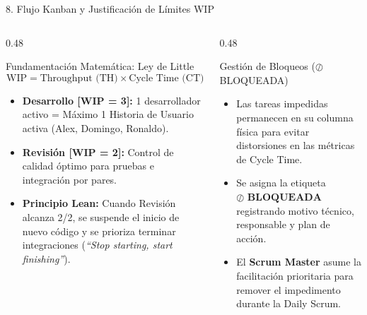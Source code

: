 \documentclass[aspectratio=169, 10pt, spanish]{beamer}
\begin{document}
\begin{frame}{8. Flujo Kanban y Justificación de Límites WIP}
\begin{columns}[T]
    \begin{column}{0.48\textwidth}
        \begin{academicbox}{Fundamentación Matemática: Ley de Little}
            \scriptsize
            $$\text{WIP} = \text{Throughput (TH)} \times \text{Cycle Time (CT)}$$
            \begin{itemize}
                \item \textbf{Desarrollo [WIP = 3]:} 1 desarrollador activo = Máximo 1 Historia de Usuario activa (Alex, Domingo, Ronaldo).
                \item \textbf{Revisión [WIP = 2]:} Control de calidad óptimo para pruebas e integración por pares.
                \item \textbf{Principio Lean:} Cuando Revisión alcanza 2/2, se suspende el inicio de nuevo código y se prioriza terminar integraciones (\textit{``Stop starting, start finishing''}).
            \end{itemize}
        \end{academicbox}
    \end{column}
    \begin{column}{0.48\textwidth}
        \begin{formalbox}{Gestión de Bloqueos ($\oslash$ BLOQUEADA)}
            \scriptsize
            \begin{itemize}
                \item Las tareas impedidas permanecen en su columna física para evitar distorsiones en las métricas de Cycle Time.
                \item Se asigna la etiqueta $\mathbf{\oslash\text{ BLOQUEADA}}$ registrando motivo técnico, responsable y plan de acción.
                \item El \textbf{Scrum Master} asume la facilitación prioritaria para remover el impedimento durante la Daily Scrum.
            \end{itemize}
        \end{formalbox}
    \end{column}
\end{columns}
\end{frame}
\end{document}
